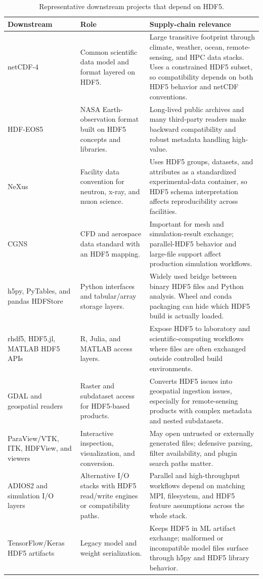 \documentclass[../main.tex]{subfiles}
\begin{document}
\begin{longtable}{@{}p{0.24\widetablewidth}p{0.32\widetablewidth}p{0.35\widetablewidth}@{}}
\caption{Representative downstream projects that depend on HDF5.}
\label{tab:downstream} \\
\hline
\textbf{Downstream} & \textbf{Role} & \textbf{Supply-chain relevance} \\
\hline
netCDF-4 &
Common scientific data model and format layered on HDF5. &
Large transitive footprint through climate, weather, ocean, remote-sensing, and
HPC data stacks. Uses a constrained HDF5 subset, so compatibility depends on both
HDF5 behavior and netCDF conventions. \\
HDF-EOS5 &
NASA Earth-observation format built on HDF5 concepts and libraries. &
Long-lived public archives and many third-party readers make backward
compatibility and robust metadata handling high-value. \\
NeXus &
Facility data convention for neutron, x-ray, and muon science. &
Uses HDF5 groups, datasets, and attributes as a standardized experimental-data
container, so HDF5 schema interpretation affects reproducibility across
facilities. \\
CGNS &
CFD and aerospace data standard with an HDF5 mapping. &
Important for mesh and simulation-result exchange; parallel-HDF5 behavior and
large-file support affect production simulation workflows. \\
h5py, PyTables, and pandas HDFStore &
Python interfaces and tabular/array storage layers. &
Widely used bridge between binary HDF5 files and Python analysis. Wheel and conda
packaging can hide which HDF5 build is actually loaded. \\
rhdf5, HDF5.jl, MATLAB HDF5 APIs &
R, Julia, and MATLAB access layers. &
Expose HDF5 to laboratory and scientific-computing workflows where files are
often exchanged outside controlled build environments. \\
GDAL and geospatial readers &
Raster and subdataset access for HDF5-based products. &
Converts HDF5 issues into geospatial ingestion issues, especially for
remote-sensing products with complex metadata and nested subdatasets. \\
ParaView/VTK, ITK, HDFView, and viewers &
Interactive inspection, visualization, and conversion. &
May open untrusted or externally generated files; defensive parsing,
filter availability, and plugin search paths matter. \\
ADIOS2 and simulation I/O layers &
Alternative I/O stacks with HDF5 read/write engines or compatibility paths. &
Parallel and high-throughput workflows depend on matching MPI, filesystem, and
HDF5 feature assumptions across the whole stack. \\
TensorFlow/Keras HDF5 artifacts &
Legacy model and weight serialization. &
Keeps HDF5 in ML artifact exchange; malformed or incompatible model files
surface through h5py and HDF5 library behavior. \\
\hline
\end{longtable}
\endgroup
\end{document}
